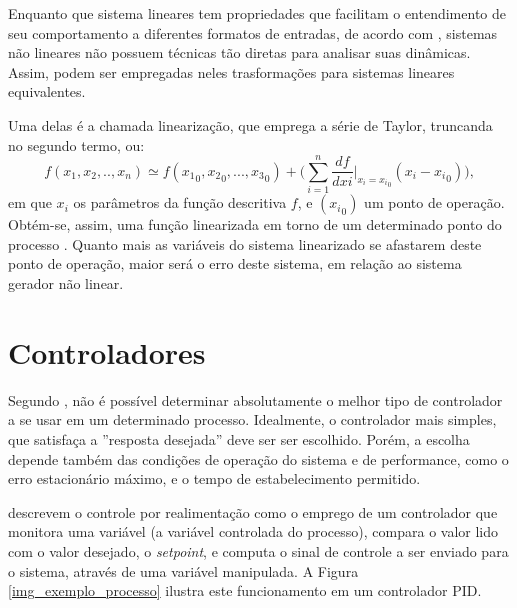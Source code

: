Enquanto que sistema lineares tem propriedades que facilitam o entendimento de seu comportamento a diferentes formatos de entradas, de acordo com , sistemas não lineares não possuem técnicas tão diretas para analisar suas dinâmicas. Assim, podem ser empregadas neles trasformações para sistemas lineares equivalentes.

Uma delas é a chamada linearização, que emprega a série de Taylor, truncanda no segundo termo, ou:
\begin{equation}
f(x_1, x_2, .. , x_n) \simeq f({x_1}_0, {x_2}_0, ..., {x_3}_0) + \bigg( \sum_{i=1}^n \frac{df}{dxi}\left.\right|_{x_i = {x_i}_0} ({x_i} - {x_i}_0) \bigg),
\end{equation}
em que $x_i$ os parâmetros da função descritiva $f$, e $({x_i}_0)$ um ponto de operação. Obtém-se, assim, uma função linearizada em torno de um determinado ponto do processo . Quanto mais as variáveis do sistema linearizado se afastarem deste ponto de operação, maior será o erro deste sistema, em relação ao sistema gerador não linear.

\section{Controladores}

Segundo , não é possível determinar absolutamente o melhor tipo de controlador a se usar em um determinado processo. Idealmente, o controlador mais simples, que satisfaça a ''resposta desejada'' deve ser ser escolhido. Porém, a escolha depende também das condições de operação do sistema e de performance, como o erro estacionário máximo, e o tempo de estabelecimento permitido.


 descrevem o controle por realimentação como o emprego de um controlador que monitora uma variável (a variável controlada do processo), compara o valor lido com o valor desejado, o \emph{setpoint}, e computa o sinal de controle a ser enviado para o sistema, através de uma variável manipulada. A Figura \ref{img_exemplo_processo} ilustra este funcionamento em um controlador PID.

